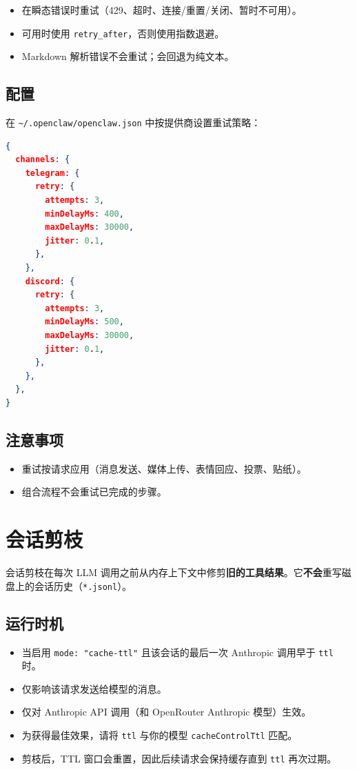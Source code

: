 \begin{itemize}
  \item 在瞬态错误时重试（429、超时、连接/重置/关闭、暂时不可用）。
  \item 可用时使用 \texttt{retry\_after}，否则使用指数退避。
  \item Markdown 解析错误不会重试；会回退为纯文本。
\end{itemize}


\subsection{配置}


在 \texttt{\textasciitilde{}/.openclaw/openclaw.json} 中按提供商设置重试策略：

\begin{lstlisting}[language=json]
{
  channels: {
    telegram: {
      retry: {
        attempts: 3,
        minDelayMs: 400,
        maxDelayMs: 30000,
        jitter: 0.1,
      },
    },
    discord: {
      retry: {
        attempts: 3,
        minDelayMs: 500,
        maxDelayMs: 30000,
        jitter: 0.1,
      },
    },
  },
}
\end{lstlisting}


\subsection{注意事项}


\begin{itemize}
  \item 重试按请求应用（消息发送、媒体上传、表情回应、投票、贴纸）。
  \item 组合流程不会重试已完成的步骤。
\end{itemize}



\clearpage

\section{会话剪枝}


会话剪枝在每次 LLM 调用之前从内存上下文中修剪\textbf{旧的工具结果}。它\textbf{不会}重写磁盘上的会话历史（\texttt{*.jsonl}）。

\subsection{运行时机}


\begin{itemize}
  \item 当启用 \texttt{mode: "cache-ttl"} 且该会话的最后一次 Anthropic 调用早于 \texttt{ttl} 时。
  \item 仅影响该请求发送给模型的消息。
  \item 仅对 Anthropic API 调用（和 OpenRouter Anthropic 模型）生效。
  \item 为获得最佳效果，请将 \texttt{ttl} 与你的模型 \texttt{cacheControlTtl} 匹配。
  \item 剪枝后，TTL 窗口会重置，因此后续请求会保持缓存直到 \texttt{ttl} 再次过期。
\end{itemize}


